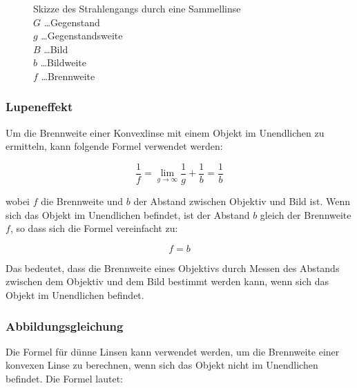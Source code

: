 \documentclass[12pt,english,ngerman]{scrartcl}
\begin{document}
\begin{figure}[H]
	\begin{center}
	\end{center}
	\caption[Skizze des Strahlengangs durch eine Sammellinse] { Skizze des Strahlengangs
		durch eine Sammellinse \cite{banzer_advanced_2022} \\
		$G$ \dots Gegenstand                               \\
		$g$ \dots Gegenstandsweite                         \\
		$B$ \dots Bild                                     \\
		$b$ \dots Bildweite                                \\
		$f$ \dots Brennweite
	}\label{fig:strahlengang_linse}
\end{figure}

\subsubsection{Lupeneffekt}

Um die Brennweite einer Konvexlinse mit einem Objekt im Unendlichen zu
ermitteln, kann folgende Formel verwendet werden:

\begin{equation}
	\frac{1}{f} = \lim_{g\to\infty}\frac{1}{g} +\frac{1}{b} = \frac{1}{b}
	\label{eq:herleitungAbbildungUnendlich}
\end{equation}

wobei $f$ die Brennweite und $b$ der Abstand zwischen Objektiv und Bild ist.
Wenn sich das Objekt im Unendlichen befindet, ist der Abstand $b$ gleich der
Brennweite $f$, so dass sich die Formel vereinfacht zu:

\begin{equation}
	f = b
	\label{eq:AbbildungUnendlich}
\end{equation}

Das bedeutet, dass die Brennweite eines Objektivs durch Messen des Abstands
zwischen dem Objektiv und dem Bild bestimmt werden kann, wenn sich das Objekt
im Unendlichen befindet.

\subsubsection{Abbildungsgleichung}
Die Formel für dünne Linsen kann verwendet werden, um die Brennweite einer
konvexen Linse zu berechnen, wenn sich das Objekt nicht im Unendlichen
befindet. Die Formel lautet:
\end{document}
